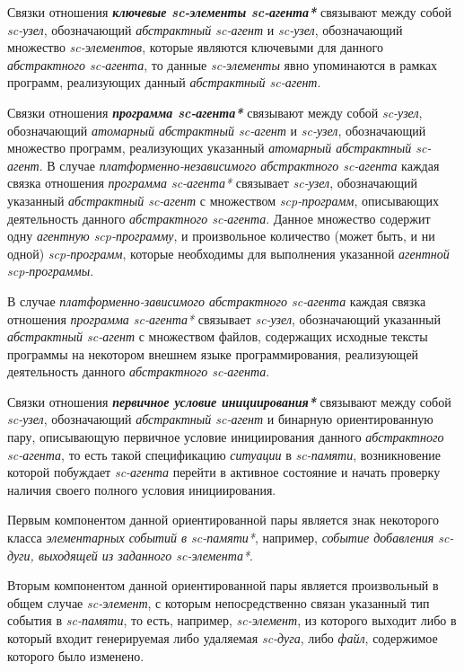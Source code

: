 Связки отношения \textbf{\textit{ключевые sc-элементы sc-агента*}} связывают между собой \textit{sc-узел}, обозначающий \textit{абстрактный sc-агент} и \textit{sc-узел}, обозначающий множество \textit{sc-элементов}, которые являются ключевыми для данного \textit{абстрактного sc-агента}, то данные \textit{sc-элементы} явно упоминаются в рамках программ, реализующих данный \textit{абстрактный sc-агент}.

Связки отношения \textbf{\textit{программа sc-агента*}} связывают между собой \textit{sc-узел}, обозначающий \textit{атомарный абстрактный sc-агент} и \textit{sc-узел}, обозначающий множество программ, реализующих указанный \textit{атомарный абстрактный sc-агент}. В случае \textit{платформенно-независимого абстрактного sc-агента} каждая связка отношения \textit{программа sc-агента*} связывает \textit{sc-узел}, обозначающий указанный \textit{абстрактный sc-агент} с множеством \textit{scp-программ}, описывающих деятельность данного \textit{абстрактного sc-агента}. Данное множество содержит одну \textit{агентную scp-программу}, и произвольное количество (может быть, и ни одной) \textit{scp-программ}, которые необходимы для выполнения указанной \textit{агентной scp-программы}.
	
В случае \textit{платформенно-зависимого абстрактного sc-агента} каждая связка отношения \textit{программа \mbox{sc-агента*}} связывает \textit{sc-узел}, обозначающий указанный \textit{абстрактный sc-агент} с множеством файлов, содержащих исходные тексты программы на некотором внешнем языке программирования, реализующей деятельность данного \textit{абстрактного sc-агента}.

Связки отношения \textbf{\textit{первичное условие инициирования*}} связывают между собой \textit{sc-узел}, обозначающий \textit{абстрактный sc-агент} и бинарную ориентированную пару, описывающую первичное условие инициирования данного \textit{абстрактного sc-агента}, то есть такой спецификацию \textit{ситуации} в \textit{sc-памяти}, возникновение которой побуждает \textit{sc-агента} перейти в активное состояние и начать проверку наличия своего полного условия инициирования.
	
Первым компонентом данной ориентированной пары является знак некоторого класса \textit{элементарных событий в sc-памяти*}, например, \textit{событие добавления sc-дуги, выходящей из заданного sc-элемента*}.

Вторым компонентом данной ориентированной пары является произвольный в общем случае \textit{sc-элемент}, с которым непосредственно связан указанный тип события в \textit{sc-памяти}, то есть, например, \textit{sc-элемент}, из которого выходит либо в который входит генерируемая либо удаляемая \textit{sc-дуга}, либо \textit{файл}, содержимое которого было изменено.

